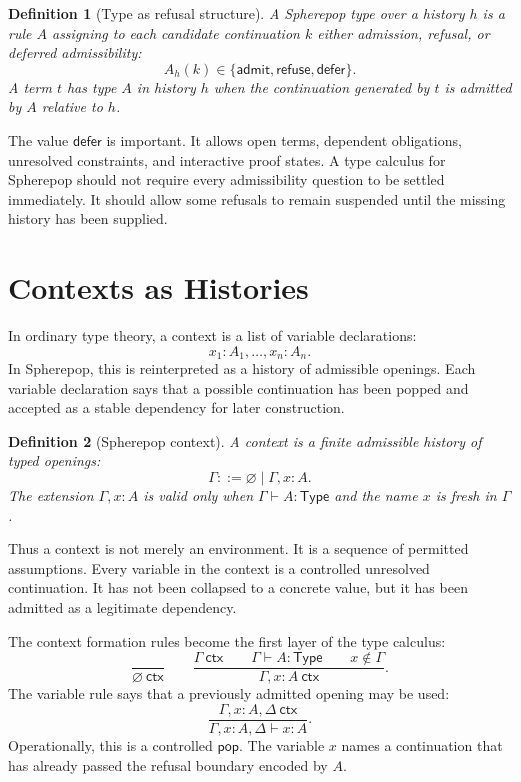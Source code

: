 \documentclass[12pt,oneside]{article}
\newtheorem{definition}{Definition}[section]
\newcommand{\Pop}{\mathsf{pop}}
\newcommand{\Type}{\mathsf{Type}}
\newcommand{\judges}{\vdash}
\begin{document}
\begin{definition}[Type as refusal structure]
A Spherepop type over a history $h$ is a rule $A$ assigning to each candidate continuation $k$ either admission, refusal, or deferred admissibility:
\[
A_h(k) \in \{\mathsf{admit},\mathsf{refuse},\mathsf{defer}\}.
\]
A term $t$ has type $A$ in history $h$ when the continuation generated by $t$ is admitted by $A$ relative to $h$.
\end{definition}

The value $\mathsf{defer}$ is important. It allows open terms, dependent obligations, unresolved constraints, and interactive proof states. A type calculus for Spherepop should not require every admissibility question to be settled immediately. It should allow some refusals to remain suspended until the missing history has been supplied.

\section{Contexts as Histories}

In ordinary type theory, a context is a list of variable declarations:
\[
x_1:A_1,\ldots,x_n:A_n.
\]
In Spherepop, this is reinterpreted as a history of admissible openings. Each variable declaration says that a possible continuation has been popped and accepted as a stable dependency for later construction.

\begin{definition}[Spherepop context]
A context is a finite admissible history of typed openings:
\[
\Gamma ::= \varnothing \mid \Gamma, x:A.
\]
The extension $\Gamma,x:A$ is valid only when $\Gamma \judges A : \Type$ and the name $x$ is fresh in $\Gamma$.
\end{definition}

Thus a context is not merely an environment. It is a sequence of permitted assumptions. Every variable in the context is a controlled unresolved continuation. It has not been collapsed to a concrete value, but it has been admitted as a legitimate dependency.

The context formation rules become the first layer of the type calculus:
\[
\frac{}{\varnothing \ \mathsf{ctx}}
\qquad
\frac{\Gamma \ \mathsf{ctx} \qquad \Gamma \judges A : \Type \qquad x \notin \Gamma}
{\Gamma,x:A \ \mathsf{ctx}}.
\]
The variable rule says that a previously admitted opening may be used:
\[
\frac{\Gamma,x:A,\Delta \ \mathsf{ctx}}
{\Gamma,x:A,\Delta \judges x : A}.
\]
Operationally, this is a controlled $\Pop$. The variable $x$ names a continuation that has already passed the refusal boundary encoded by $A$.
\end{document}
